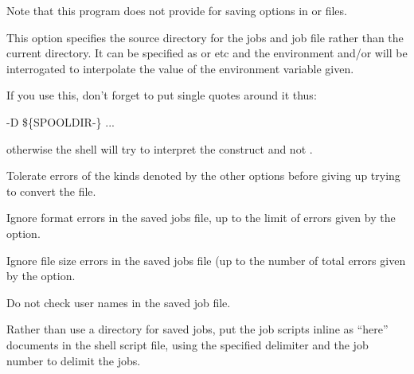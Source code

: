 Note that this program does not provide for saving options in \configurationfile{} or \homeconfigpath{} files.



This option specifies the source directory for the jobs and job file
rather than the current directory. It can be specified as  or
 etc and the environment and/or \linebreak[3]\masterconfig{} will be
interrogated to interpolate the value of the environment variable given.

If you use this, don't forget to put single quotes around it thus:

\begin{expara}

\XbCjlistName{} -D
{\textquotesingle}\$\{SPOOLDIR-\spooldirname\}{\textquotesingle}
...

\end{expara}

otherwise the shell will try to interpret the \exampletext{\$} construct and not \PrXbCjlist{}.


Tolerate  errors of the kinds denoted by the other options before giving up trying to convert the file.


Ignore format errors in the saved jobs file, up to the limit of errors given by the  option.


Ignore file size errors in the saved jobs file (up to the number of total errors given by the 
option.


Do not check user names in the saved job file.


Rather than use a directory for saved jobs, put the job scripts inline as ``here'' documents in the shell script file, using
the specified delimiter and the job number to delimit the jobs.


